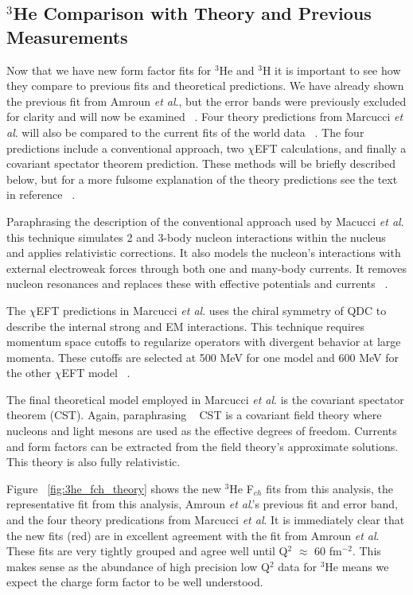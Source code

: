 \subsection{$^3$He Comparison with Theory and Previous Measurements}
\label{ssec:3he_comparison_with_theory}

Now that we have new form factor fits for $^3$He and $^3$H it is important to see how they compare to previous fits and theoretical predictions. We have already shown the previous fit from Amroun \textit{et al}., but the error bands were previously excluded for clarity and will now be examined ~\cite{Article:Amroun}. Four theory predictions from Marcucci \textit{et al}. will also be compared to the current fits of the world data ~\cite{Article:Marcucci}. The four predictions include a conventional approach, two $\chi$EFT calculations, and finally a covariant spectator theorem prediction. These methods will be briefly described below, but for a more fulsome explanation of the theory predictions see the text in reference ~\cite{Article:Marcucci}.

Paraphrasing the description of the conventional approach used by Macucci \textit{et al}. this technique simulates 2 and 3-body nucleon interactions within the nucleus and applies relativistic corrections. It also models the nucleon's interactions with external electroweak forces through both one and many-body currents. It removes nucleon resonances and replaces these with effective potentials and currents ~\cite{Article:Marcucci}.

The $\chi$EFT predictions in Marcucci \textit{et al}. uses the chiral symmetry of QDC to describe the internal strong and EM interactions. This technique requires momentum space cutoffs to regularize operators with divergent behavior at large momenta. These cutoffs are selected at 500 MeV for one model and 600 MeV for the other $\chi$EFT model ~\cite{Article:Marcucci}.

The final theoretical model employed in Marcucci \textit{et al}. is the covariant spectator theorem (CST). Again, paraphrasing ~\cite{Article:Marcucci} CST is a covariant field theory where nucleons and light mesons are used as the effective degrees of freedom. Currents and form factors can be extracted from the field theory's approximate solutions. This theory is also fully relativistic.

Figure ~\ref{fig:3he_fch_theory} shows the new $^3$He F$_{ch}$ fits from this analysis, the representative fit from this analysis, Amroun \textit{et al}.'s previous fit and error band, and the four theory predications from Marcucci \textit{et al}. It is immediately clear that the new fits (red) are in excellent agreement with the fit from Amroun \textit{et al}. These fits are very tightly grouped and agree well until Q$^2$ $\approx$ 60 fm$^{-2}$. This makes sense as the abundance of high precision low Q$^2$ data for $^3$He means we expect the charge form factor to be well understood. 


